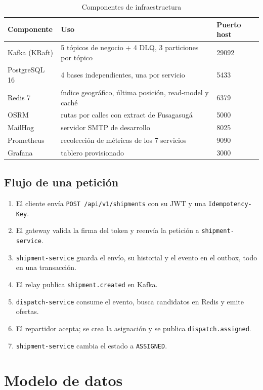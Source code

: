 \documentclass[10pt,letterpaper,twocolumn,oneside]{report}
\newcommand{\pkg}[1]{\texttt{#1}}
\begin{document}
\begin{table}[t]
\centering
\caption{Componentes de infraestructura}
\small
\begin{tabular}{@{}L{3.2cm}L{8.2cm}L{3cm}@{}}
\toprule
\textbf{Componente} & \textbf{Uso} & \textbf{Puerto host}\\
\midrule
Kafka (KRaft) & 5 tópicos de negocio + 4 DLQ, 3 particiones por tópico & 29092\\
PostgreSQL 16 & 4 bases independientes, una por servicio & 5433\\
Redis 7 & índice geográfico, última posición, read-model y caché & 6379\\
OSRM & rutas por calles con extract de Fusagasugá & 5000\\
MailHog & servidor SMTP de desarrollo & 8025\\
Prometheus & recolección de métricas de los 7 servicios & 9090\\
Grafana & tablero provisionado & 3000\\
\bottomrule
\end{tabular}
\end{table}

\section{Flujo de una petición}

\begin{enumerate}[leftmargin=1.2cm]
  \item El cliente envía \pkg{POST /api/v1/shipments} con su JWT y una \pkg{Idempotency-Key}.
  \item El gateway valida la firma del token y reenvía la petición a \pkg{shipment-service}.
  \item \pkg{shipment-service} guarda el envío, su historial y el evento en el outbox, todo en
        una transacción.
  \item El relay publica \pkg{shipment.created} en Kafka.
  \item \pkg{dispatch-service} consume el evento, busca candidatos en Redis y emite ofertas.
  \item El repartidor acepta; se crea la asignación y se publica \pkg{dispatch.assigned}.
  \item \pkg{shipment-service} cambia el estado a \texttt{ASSIGNED}.
\end{enumerate}

\onecolumn
\chapter{Modelo de datos}
\label{ch:datos}
\end{document}
